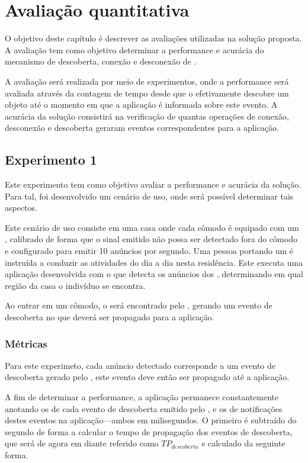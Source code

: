 \chapter{Avaliação quantitativa}\label{chap:avaliacao}

O objetivo deste capítulo é descrever as avaliações utilizadas na solução proposta. A avaliação tem como objetivo determinar a performance e acurácia do mecanismo de descoberta, conexão e desconexão de \smartobjs.

A avaliação será realizada por meio de experimentos, onde a performance será avaliada através da contagem de tempo desde que o \mhub efetivamente descobre um objeto até o momento em que a aplicação é informada sobre este evento. A acurácia da solução consistirá na verificação de quantas operações de conexão, desconexão e descoberta geraram eventos correspondentes para a aplicação.

\section{Experimento 1}\label{chap:avaliacao-experimento1}

Este experimento tem como objetivo avaliar a performance e acurácia da solução. Para tal, foi desenvolvido um cenário de uso, onde será possível determinar tais aspectos.

Este cenário de uso consiste em uma casa onde cada cômodo é equipado com um \beacon \ble, calibrado de forma que o sinal emitido não possa ser detectado fora do cômodo e configurado para emitir 10 anúncios por segundo. Uma pessoa portando um \smartphone é instruída a conduzir as atividades do dia a dia nesta residência. Este \smartphone executa uma aplicação desenvolvida com o \middleware \mhubcddl que detecta os anúncios dos \beacons, determinando em qual região da casa o indivíduo se encontra.

Ao entrar em um cômodo, o \beacon será encontrado pelo \mhubcddl, gerando um evento de descoberta no \stwopa que deverá ser propagado para a aplicação.

\subsection{Métricas}

Para este experimeto, cada anúncio detectado corresponde a um evento de descoberta gerado pelo \stwopa, este evento deve então ser propagado até a aplicação.

A fim de determinar a performance, a aplicação permanece constantemente anotando os \timestamps de cada evento de descoberta emitido pelo \stwopa, e os \timestamps de notificações destes eventos na aplicação---ambos em milisegundos. O primeiro \timestamp é subtraído do segundo de forma a calcular o tempo de propagação dos eventos de descoberta, que será de agora em diante referido como $TP_{descoberta}$ e calculado da seguinte forma. 

